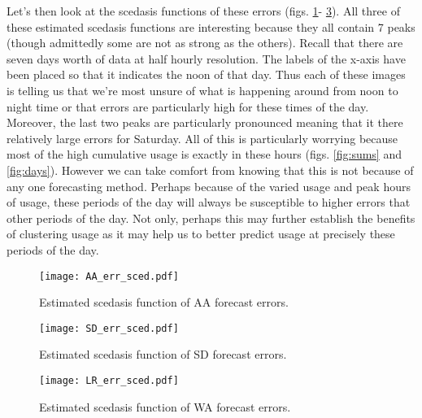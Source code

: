 Let's then look at the scedasis functions of these errors (figs. \ref{fig:AA_err_sced}- \ref{fig:LR_err_sced}). All three of these estimated scedasis functions are interesting because they all contain 7 peaks (though admittedly some are not as strong as the others). Recall that there are seven days worth of data at half hourly resolution. The labels of the x-axis have been placed so that it indicates the noon of that day. Thus each of these images is telling us that we're most unsure of what is happening around from noon to night time or that errors are particularly high for these times of the day. Moreover, the last two peaks are particularly pronounced meaning that it there relatively large errors for Saturday. All of this is particularly worrying because most of the high cumulative usage is exactly in these hours (figs. \ref{fig:sums} and \ref{fig:days}). However we can take comfort from knowing that this is not because of any one forecasting method. Perhaps because of the varied usage and peak hours of usage, these periods of the day will always be susceptible to higher errors that other periods of the day. Not only, perhaps this may further establish the benefits of clustering usage as it may help us to better predict usage at precisely these periods of the day.

\begin{figure}
\centering
\texttt{[image: AA\_err\_sced.pdf]}
\caption{\label{fig:AA_err_sced} Estimated scedasis function of AA forecast errors.}
\end{figure}

\begin{figure}
\centering
\texttt{[image: SD\_err\_sced.pdf]}
\caption{\label{fig:SD_err_sced} Estimated scedasis function of SD forecast errors.}
\end{figure}

\begin{figure}
\centering
\texttt{[image: LR\_err\_sced.pdf]}
\caption{\label{fig:LR_err_sced} Estimated scedasis function of WA forecast errors.}
\end{figure}



